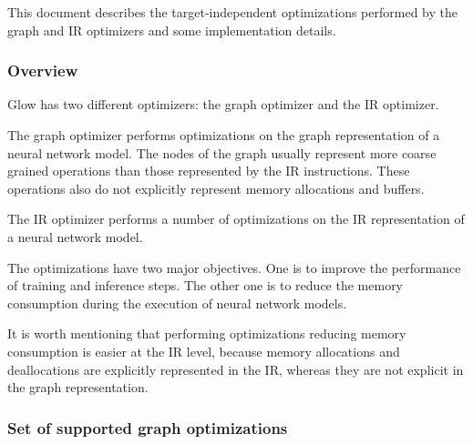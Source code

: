 This document describes the target-\/independent optimizations performed by the graph and IR optimizers and some implementation details.

\subsubsection*{Overview}

Glow has two different optimizers\+: the graph optimizer and the IR optimizer.

The graph optimizer performs optimizations on the graph representation of a neural network model. The nodes of the graph usually represent more coarse grained operations than those represented by the IR instructions. These operations also do not explicitly represent memory allocations and buffers.

The IR optimizer performs a number of optimizations on the IR representation of a neural network model.

The optimizations have two major objectives. One is to improve the performance of training and inference steps. The other one is to reduce the memory consumption during the execution of neural network models.

It is worth mentioning that performing optimizations reducing memory consumption is easier at the IR level, because memory allocations and deallocations are explicitly represented in the IR, whereas they are not explicit in the graph representation.

\subsubsection*{Set of supported graph optimizations}

